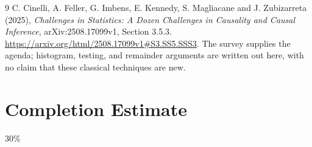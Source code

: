 \documentclass[11pt,a4paper]{article}
\theoremstyle{remark}
\begin{document}
\begin{thebibliography}{9}
 C. Cinelli, A. Feller, G. Imbens, E. Kennedy, S. Magliacane and J. Zubizarreta (2025), \emph{Challenges in Statistics: A Dozen Challenges in Causality and Causal Inference}, arXiv:2508.17099v1, Section 3.5.3. \url{https://arxiv.org/html/2508.17099v1#S3.SS5.SSS3}. The survey supplies the agenda; histogram, testing, and remainder arguments are written out here, with no claim that these classical techniques are new.
\end{thebibliography}

\section{Completion Estimate}
30\%
\end{document}
